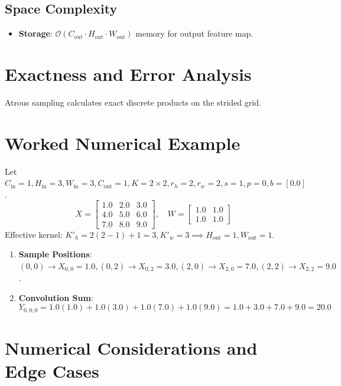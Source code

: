\documentclass[11pt,a4paper]{article}
\theoremstyle{definition}
\begin{document}
\subsection{Space Complexity}
\begin{itemize}
    \item \textbf{Storage}: $\mathcal{O}(C_{\text{out}} \cdot H_{\text{out}} \cdot W_{\text{out}})$ memory for output feature map.
\end{itemize}

\section{Exactness and Error Analysis}

Atrous sampling calculates exact discrete products on the strided grid.

\section{Worked Numerical Example}

Let $C_{\text{in}} = 1, H_{\text{in}} = 3, W_{\text{in}} = 3, C_{\text{out}} = 1, K = 2 \times 2, r_h = 2, r_w = 2, s = 1, p = 0, b = [0.0]$.
\begin{equation}
X = \begin{bmatrix} 1.0 & 2.0 & 3.0 \\ 4.0 & 5.0 & 6.0 \\ 7.0 & 8.0 & 9.0 \end{bmatrix}, \quad W = \begin{bmatrix} 1.0 & 1.0 \\ 1.0 & 1.0 \end{bmatrix}
\end{equation}
Effective kernel: $K'_h = 2(2-1)+1 = 3, K'_w = 3 \implies H_{\text{out}} = 1, W_{\text{out}} = 1$.

\begin{enumerate}
    \item \textbf{Sample Positions}:
    $(0, 0) \to X_{0, 0} = 1.0, (0, 2) \to X_{0, 2} = 3.0, (2, 0) \to X_{2, 0} = 7.0, (2, 2) \to X_{2, 2} = 9.0$.
    \item \textbf{Convolution Sum}:
    \begin{equation}
    Y_{0, 0, 0} = 1.0(1.0) + 1.0(3.0) + 1.0(7.0) + 1.0(9.0) = 1.0 + 3.0 + 7.0 + 9.0 = 20.0
    \end{equation}
\end{enumerate}

\section{Numerical Considerations and Edge Cases}
\end{document}
